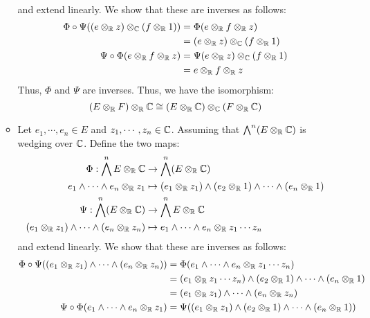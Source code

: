 \documentclass[12pt]{article}
\begin{document}
\begin{solution}
\begin{enumerate}
\begin{itemize}
\begin{align*}
            \end{align*} 
            and extend linearly. We show that these are inverses as follows:
            \begin{align*}
                \Phi \circ \Psi( (e \otimes_\mathbb R z) \otimes_\mathbb C (f \otimes_\mathbb R 1)) &=  \Phi(e \otimes_\mathbb R f \otimes_\mathbb R z) \\ 
                &= (e \otimes_\mathbb R z) \otimes_\mathbb C (f \otimes_\mathbb R 1)\\ 
                \Psi \circ \Phi(e \otimes_\mathbb R f \otimes_\mathbb R z) &= \Psi(e \otimes_\mathbb R z) \otimes_\mathbb C (f \otimes_\mathbb R 1) \\
                &= e \otimes_\mathbb R f \otimes_\mathbb R z
            \end{align*}
            Thus, $\Phi$ and $\Psi$ are inverses. Thus, we have the isomorphism:
            \[ (E \otimes_\mathbb R F) \otimes_\mathbb R \mathbb C \cong  (E \otimes_\mathbb R \mathbb C) \otimes_\mathbb C (F \otimes_\mathbb R \mathbb C) \]
            \item Let $e_1, \cdots, e_n \in E$ and $z_1, \cdots, z_n \in \mathbb C$. Assuming that $\bigwedge^n (E \otimes_\mathbb R \mathbb C)$ is wedging over $\mathbb C$. Define the two maps: 
            \begin{align*}
                \Phi: \bigwedge^n E \otimes_\mathbb R \mathbb C &\to \bigwedge^n (E \otimes_\mathbb R \mathbb C)\\
                e_1 \wedge \cdots \wedge e_n \otimes_\mathbb R z_1 &\mapsto (e_1 \otimes_\mathbb R z_1) \wedge (e_2 \otimes_\mathbb R 1) \wedge \cdots \wedge (e_n \otimes_\mathbb R 1) \\
                \Psi: \bigwedge^n (E \otimes_\mathbb R \mathbb C)  &\to \bigwedge^n E \otimes_\mathbb R \mathbb C \\
                (e_1 \otimes_\mathbb R z_1) \wedge \cdots \wedge (e_n \otimes_\mathbb R z_n) &\mapsto e_1 \wedge \cdots \wedge e_n \otimes_\mathbb R z_1 \cdots z_n
            \end{align*} 
            and extend linearly. We show that these are inverses as follows:
            \begin{align*}
                \Phi \circ \Psi( (e_1 \otimes_\R z_1) \wedge \cdots \wedge (e_n \otimes_\R z_n) ) &=  \Phi(e_1 \wedge \cdots \wedge e_n \otimes_\R z_1 \cdots z_n) \\ 
                &= (e_1 \otimes_\R z_1\cdots z_n) \wedge (e_2 \otimes_\R 1) \wedge  \cdots \wedge (e_n \otimes_\R 1)\\ 
                &= (e_1 \otimes_\R z_1) \wedge \cdots \wedge (e_n \otimes_\R z_n)\\ 
                \Psi \circ \Phi(e_1 \wedge \cdots \wedge e_n \otimes_\R z_1) &= \Psi((e_1 \otimes_\R z_1) \wedge (e_2 \otimes_\R 1) \wedge  \cdots \wedge (e_n \otimes_\R 1)) \\

\end{align*}
\end{itemize}
\end{enumerate}
\end{solution}
\end{document}
